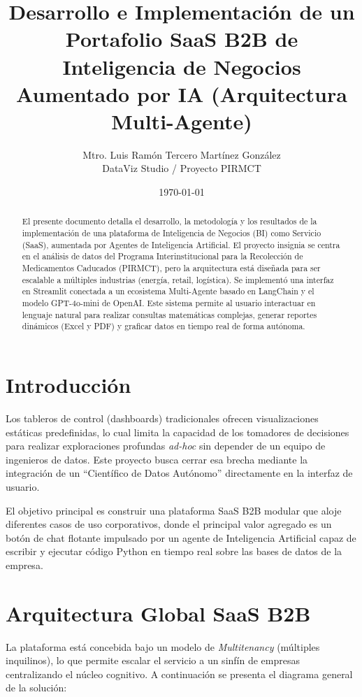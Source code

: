 \documentclass[12pt,a4paper]{article}
\title{\textbf{Desarrollo e Implementación de un Portafolio SaaS B2B de Inteligencia de Negocios Aumentado por IA (Arquitectura Multi-Agente)}}
\author{Mtro. Luis Ramón Tercero Martínez González \\ DataViz Studio / Proyecto PIRMCT}
\date{\today}
\begin{document}
\maketitle

\begin{abstract}
El presente documento detalla el desarrollo, la metodología y los resultados de la implementación de una plataforma de Inteligencia de Negocios (BI) como Servicio (SaaS), aumentada por Agentes de Inteligencia Artificial. El proyecto insignia se centra en el análisis de datos del Programa Interinstitucional para la Recolección de Medicamentos Caducados (PIRMCT), pero la arquitectura está diseñada para ser escalable a múltiples industrias (energía, retail, logística). Se implementó una interfaz en Streamlit conectada a un ecosistema Multi-Agente basado en LangChain y el modelo GPT-4o-mini de OpenAI. Este sistema permite al usuario interactuar en lenguaje natural para realizar consultas matemáticas complejas, generar reportes dinámicos (Excel y PDF) y graficar datos en tiempo real de forma autónoma.
\end{abstract}



\newpage



\tableofcontents
\newpage

\section{Introducción}
Los tableros de control (dashboards) tradicionales ofrecen visualizaciones estáticas predefinidas, lo cual limita la capacidad de los tomadores de decisiones para realizar exploraciones profundas \textit{ad-hoc} sin depender de un equipo de ingenieros de datos. Este proyecto busca cerrar esa brecha mediante la integración de un ``Científico de Datos Autónomo'' directamente en la interfaz de usuario. 

El objetivo principal es construir una plataforma SaaS B2B modular que aloje diferentes casos de uso corporativos, donde el principal valor agregado es un botón de chat flotante impulsado por un agente de Inteligencia Artificial capaz de escribir y ejecutar código Python en tiempo real sobre las bases de datos de la empresa.

\section{Arquitectura Global SaaS B2B}
La plataforma está concebida bajo un modelo de \textit{Multitenancy} (múltiples inquilinos), lo que permite escalar el servicio a un sinfín de empresas centralizando el núcleo cognitivo. A continuación se presenta el diagrama general de la solución:
\end{document}
